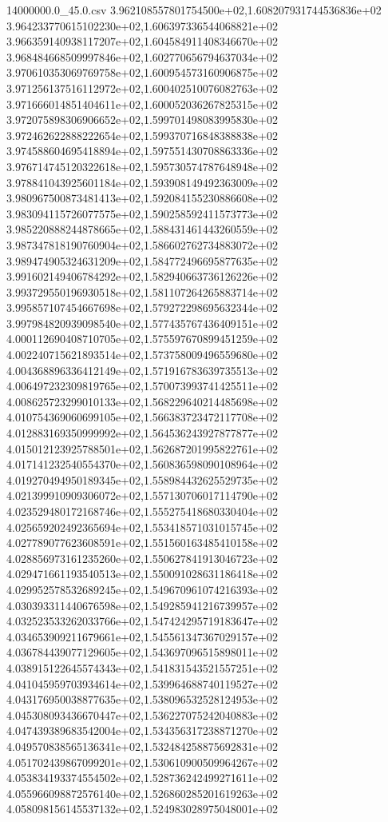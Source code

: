 \begin{filecontents*}{14000000.0_45.0.csv}
3.962108557801754500e+02,1.608207931744536836e+02
3.964233770615102230e+02,1.606397336544068821e+02
3.966359140938117207e+02,1.604584911408346670e+02
3.968484668509997846e+02,1.602770656794637034e+02
3.970610353069769758e+02,1.600954573160906875e+02
3.971256137516112972e+02,1.600402510076082763e+02
3.971666014851404611e+02,1.600052036267825315e+02
3.972075898306906652e+02,1.599701498083995830e+02
3.972462622888222654e+02,1.599370716848388838e+02
3.974588604695418894e+02,1.597551430708863336e+02
3.976714745120322618e+02,1.595730574787648948e+02
3.978841043925601184e+02,1.593908149492363009e+02
3.980967500873481413e+02,1.592084155230886608e+02
3.983094115726077575e+02,1.590258592411573773e+02
3.985220888244878665e+02,1.588431461443260559e+02
3.987347818190760904e+02,1.586602762734883072e+02
3.989474905324631209e+02,1.584772496695877635e+02
3.991602149406784292e+02,1.582940663736126226e+02
3.993729550196930518e+02,1.581107264265883714e+02
3.995857107454667698e+02,1.579272298695632344e+02
3.997984820939098540e+02,1.577435767436409151e+02
4.000112690408710705e+02,1.575597670899451259e+02
4.002240715621893514e+02,1.573758009496559680e+02
4.004368896336412149e+02,1.571916783639735513e+02
4.006497232309819765e+02,1.570073993741425511e+02
4.008625723299010133e+02,1.568229640214485698e+02
4.010754369060699105e+02,1.566383723472117708e+02
4.012883169350999992e+02,1.564536243927877877e+02
4.015012123925788501e+02,1.562687201995822761e+02
4.017141232540554370e+02,1.560836598090108964e+02
4.019270494950189345e+02,1.558984432625529735e+02
4.021399910909306072e+02,1.557130706017114790e+02
4.023529480172168746e+02,1.555275418680330404e+02
4.025659202492365694e+02,1.553418571031015745e+02
4.027789077623608591e+02,1.551560163485410158e+02
4.028856973161235260e+02,1.550627841913046723e+02
4.029471661193540513e+02,1.550091028631186418e+02
4.029952578532689245e+02,1.549670961074216393e+02
4.030393311440676598e+02,1.549285941216739957e+02
4.032523533262033766e+02,1.547424295719183647e+02
4.034653909211679661e+02,1.545561347367029157e+02
4.036784439077129605e+02,1.543697096515898011e+02
4.038915122645574343e+02,1.541831543521557251e+02
4.041045959703934614e+02,1.539964688740119527e+02
4.043176950038877635e+02,1.538096532528124953e+02
4.045308093436670447e+02,1.536227075242040883e+02
4.047439389683542004e+02,1.534356317238871270e+02
4.049570838565136341e+02,1.532484258875692831e+02
4.051702439867099201e+02,1.530610900509964267e+02
4.053834193374554502e+02,1.528736242499271611e+02
4.055966098872576140e+02,1.526860285201619263e+02
4.058098156145537132e+02,1.524983028975048001e+02

\end{filecontents*}

